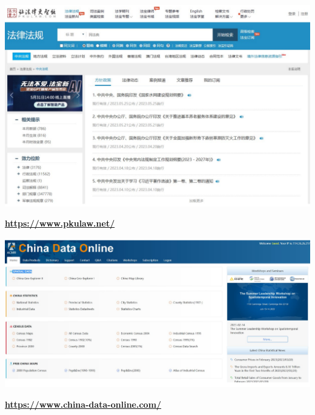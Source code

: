 \documentclass[
  10pt,
  ignorenonframetext,
]{beamer}
\begin{document}
\begin{frame}
\vspace{0.4cm}

\begin{center}\includegraphics[width=0.9\linewidth]{Figs/pkulaw_crop} \end{center}
\vspace{0.3cm}
\begin{center}
\textbf{\url{https://www.pkulaw.net/}}
\end{center}
\end{frame}

\begin{frame}
\vspace{0.4cm}

\begin{center}\includegraphics[width=0.9\linewidth]{Figs/cdo_crop} \end{center}
\vspace{0.3cm}
\begin{center}
\textbf{\url{https://www.china-data-online.com/}}
\end{center}
\end{frame}
\end{document}
